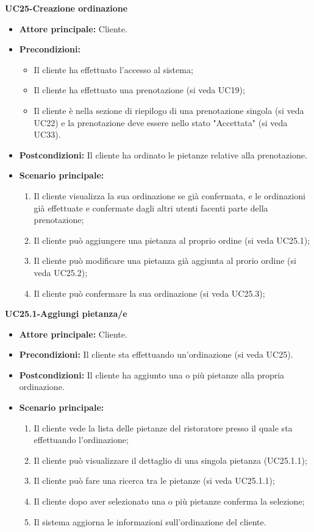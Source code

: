 \textbf{UC25-Creazione ordinazione}
\begin{itemize}
\item \textbf{Attore principale:} Cliente.
\item \textbf{Precondizioni:} 
\begin{itemize}
    \item Il cliente ha effettuato l'accesso al sistema;
    \item Il cliente ha effettuato una prenotazione (si veda UC19);
    \item Il cliente è nella sezione di riepilogo di una prenotazione singola (si veda UC22) e la prenotazione deve essere nello stato "Accettata" (si veda UC33).
\end{itemize}
\item \textbf{Postcondizioni:} Il cliente ha ordinato le pietanze relative alla prenotazione.
\item \textbf{Scenario principale:}
\begin{enumerate}
    \item Il cliente visualizza la sua ordinazione se già confermata, e le ordinazioni già effettuate e confermate dagli altri utenti facenti parte della prenotazione;
    \item Il cliente può aggiungere una pietanza al proprio ordine (si veda UC25.1);
    \item Il cliente può modificare una pietanza già aggiunta al prorio ordine (si veda UC25.2);
    \item Il cliente può confermare la sua ordinazione (si veda UC25.3);
\end{enumerate}
\end{itemize}

\textbf{UC25.1-Aggiungi pietanza/e}
\begin{itemize}
\item \textbf{Attore principale:} Cliente.
\item \textbf{Precondizioni:} Il cliente sta effettuando un'ordinazione (si veda UC25).
\item \textbf{Postcondizioni:} Il cliente ha aggiunto una o più pietanze alla propria ordinazione.
\item \textbf{Scenario principale:}
\begin{enumerate}
    \item Il cliente vede la lista delle pietanze del ristoratore presso il quale sta effettuando l'ordinazione;
    \item Il cliente può visualizzare il dettaglio di una singola pietanza (UC25.1.1);
    \item Il cliente può fare una ricerca tra le pietanze (si veda UC25.1.1);
    \item Il cliente dopo aver selezionato una o più pietanze conferma la selezione;
    \item Il sistema aggiorna le informazioni sull'ordinazione del cliente.
\end{enumerate}
\end{itemize}

